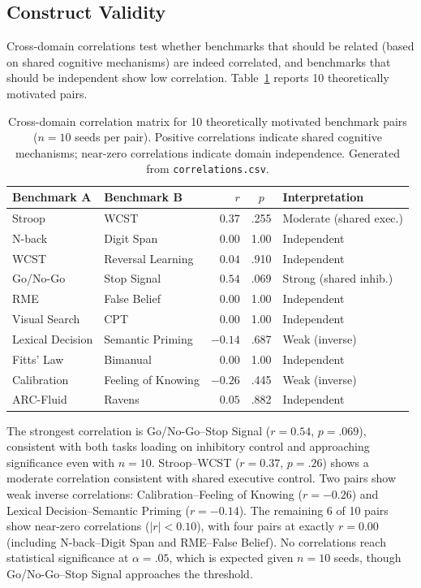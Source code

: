 \documentclass[11pt,letterpaper]{article}
\begin{document}
\subsection{Construct Validity}

Cross-domain correlations test whether benchmarks that should be related (based on shared cognitive mechanisms) are indeed correlated, and benchmarks that should be independent show low correlation. Table~\ref{tab:correlations} reports 10 theoretically motivated pairs.

\begin{table}[t]
\centering
\caption{Cross-domain correlation matrix for 10 theoretically motivated benchmark pairs ($n = 10$ seeds per pair). Positive correlations indicate shared cognitive mechanisms; near-zero correlations indicate domain independence. Generated from \texttt{correlations.csv}.}
\label{tab:correlations}
\small
\begin{tabular}{@{}llrcl@{}}
\toprule
\textbf{Benchmark A} & \textbf{Benchmark B} & \textbf{$r$} & \textbf{$p$} & \textbf{Interpretation} \\
\midrule
Stroop             & WCST               &  $0.37$ & .255 & Moderate (shared exec.) \\
N-back             & Digit Span         &  $0.00$ & 1.00 & Independent \\
WCST               & Reversal Learning  &  $0.04$ & .910 & Independent \\
Go/No-Go           & Stop Signal        &  $0.54$ & .069 & Strong (shared inhib.) \\
RME                & False Belief       &  $0.00$ & 1.00 & Independent \\
Visual Search      & CPT                &  $0.00$ & 1.00 & Independent \\
Lexical Decision   & Semantic Priming   & $-0.14$ & .687 & Weak (inverse) \\
Fitts' Law         & Bimanual           &  $0.00$ & 1.00 & Independent \\
Calibration        & Feeling of Knowing & $-0.26$ & .445 & Weak (inverse) \\
ARC-Fluid          & Ravens             &  $0.05$ & .882 & Independent \\
\bottomrule
\end{tabular}
\end{table}

The strongest correlation is Go/No-Go--Stop Signal ($r = 0.54$, $p = .069$), consistent with both tasks loading on inhibitory control and approaching significance even with $n = 10$. Stroop--WCST ($r = 0.37$, $p = .26$) shows a moderate correlation consistent with shared executive control. Two pairs show weak inverse correlations: Calibration--Feeling of Knowing ($r = -0.26$) and Lexical Decision--Semantic Priming ($r = -0.14$). The remaining 6 of 10 pairs show near-zero correlations ($|r| < 0.10$), with four pairs at exactly $r = 0.00$ (including N-back--Digit Span and RME--False Belief). No correlations reach statistical significance at $\alpha = .05$, which is expected given $n = 10$ seeds, though Go/No-Go--Stop Signal approaches the threshold.
\end{document}
